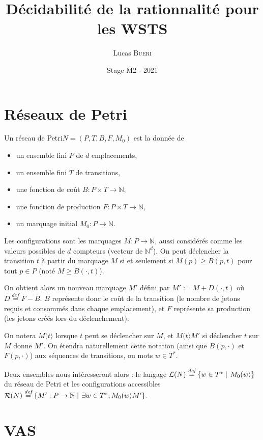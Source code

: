 \documentclass[a4paper,final]{article}
\title{Décidabilité de la rationnalité pour les WSTS}
\author{Lucas \textsc{Bueri}}
\date{Stage M2 - 2021}
\theoremstyle{definition}
\let\geq\geqslant
\newcommand{\set}[2]{\left\{#1\mathrel{\left|\vphantom{#1}\vphantom{#2}\right.}#2\right\}}
\newcommand{\defeq}{\ensuremath{\stackrel{\textit{def}}{=}}}
\newcommand{\N}{\ensuremath{\mathbb{N}}}
\newcommand{\petri}{réseau de Petri\xspace}
\newcommand{\fire}[2]{\ensuremath{#1 (#2\rangle}}
\newcommand{\lang}{\ensuremath{\mathcal{L}}}
\newcommand{\reach}{\ensuremath{\mathcal{R}}}
\begin{document}
\maketitle


\section{Réseaux de Petri}

Un \petri $N = (P,T,B,F,M_0)$ est la donnée de
\begin{itemize}
    \item un ensemble fini $P$ de $d$ emplacements,
    \item un ensemble fini $T$ de transitions,
    \item une fonction de coût $B: P\times T\to\N$,
    \item une fonction de production $F: P\times T\to\N$,
    \item un marquage initial $M_0: P\to\N$.
\end{itemize}

Les configurations sont les marquages $M: P\to\N$, aussi considérés comme les valeurs possibles de $d$ compteurs (vecteur de $\N^d$).
On peut déclencher la transition $t$ à partir du marquage $M$ si et
seulement si $M(p)\geq B(p,t)$ pour tout $p\in P$ (noté $M\geq B(\cdot,t)$).

On obtient alors un nouveau marquage $M'$ défini par $M':=M+D(\cdot,t)$ où $D\defeq F-B$. 
$B$ représente donc le coût de la transition (le nombre de jetons requis et consommés dans chaque emplacement), et $F$ représente sa production (les jetons créés lors du déclenchement).

On notera $\fire{M}{t}$ lorsque $t$ peut se déclencher sur $M$, et $\fire{M}{t}M'$ si déclencher $t$ sur $M$ donne $M'$.
On étendra naturellement cette notation (ainsi que $B(p,\cdot)$ et $F(p,\cdot)$) aux séquences de transitions, ou mots $w\in T^\ast$.

Deux ensembles nous intéresseront alors : le langage $\lang(N)\defeq \set{w\in T^\ast} {\fire{M_0}{w}}$ du \petri et les configurations accessibles $\reach(N)\defeq \set{M':P\to\N}{\exists w\in T^\ast, \fire{M_0}{w}M'}$.


\section{VAS}
\end{document}
